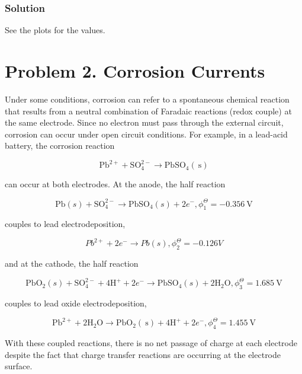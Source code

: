 \documentclass[12pt]{article}
\begin{document}
\subsubsection{Solution}
See the plots for the values.

\section{Problem 2. Corrosion Currents}
Under some conditions, corrosion can refer to a spontaneous chemical reaction that results from a neutral combination of Faradaic reactions (redox couple) at the same electrode. Since no electron must pass through the external circuit, corrosion can occur under open circuit conditions. For example, in a lead-acid battery, the corrosion reaction

$$
\mathrm{Pb}^{2+}+\mathrm{SO}_{4}^{2-} \rightarrow \mathrm{PbSO}_{4}(\mathrm{~s})
$$

can occur at both electrodes. At the anode, the half reaction


\begin{equation*}
\mathrm{Pb}(s)+\mathrm{SO}_{4}^{2-} \rightarrow \mathrm{PbSO}_{4}(s)+2 e^{-}, \phi_{1}^{\Theta}=-0.356 \mathrm{~V} \tag{1}
\end{equation*}


couples to lead electrodeposition,


\begin{equation*}
P b^{2+}+2 e^{-} \rightarrow P b(s), \phi_{2}^{\Theta}=-0.126 V \tag{2}
\end{equation*}


and at the cathode, the half reaction


\begin{equation*}
\mathrm{PbO}_{2}(s)+\mathrm{SO}_{4}^{2-}+4 \mathrm{H}^{+}+2 e^{-} \rightarrow \mathrm{PbSO}_{4}(s)+2 \mathrm{H}_{2} \mathrm{O}, \phi_{3}^{\Theta}=1.685 \mathrm{~V} \tag{3}
\end{equation*}


couples to lead oxide electrodeposition,


\begin{equation*}
\mathrm{Pb}^{2+}+2 \mathrm{H}_{2} \mathrm{O} \rightarrow \mathrm{PbO}_{2}(\mathrm{~s})+4 \mathrm{H}^{+}+2 e^{-}, \phi_{4}^{\Theta}=1.455 \mathrm{~V} \tag{4}
\end{equation*}


With these coupled reactions, there is no net passage of charge at each electrode despite the fact that charge transfer reactions are occurring at the electrode surface.\\
\end{document}

